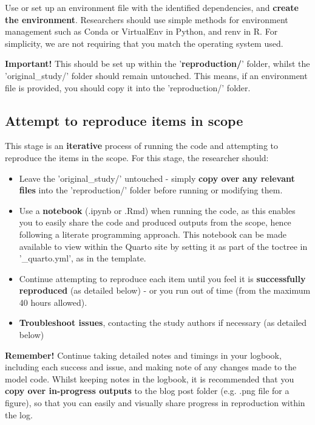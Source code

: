 Use or set up an environment file with the identified dependencies, and \textbf{create the environment}. Researchers should use simple methods for environment management such as Conda or VirtualEnv in Python, and renv in R. For simplicity, we are not requiring that you match the operating system used.

\textbf{Important!} This should be set up within the '\textbf{reproduction/}' folder, whilst the 'original\_study/' folder should remain untouched. This means, if an environment file is provided, you should copy it into the 'reproduction/' folder.

\vspace{0.5cm}
\subsection{Attempt to reproduce items in scope}

This stage is an \textbf{iterative} process of running the code and attempting to reproduce the items in the scope. For this stage, the researcher should:
\begin{itemize}
    \item Leave the 'original\_study/' untouched - simply \textbf{copy over any relevant files} into the 'reproduction/' folder before running or modifying them.
    \item Use a \textbf{notebook} (.ipynb or .Rmd) when running the code, as this enables you to easily share the code and produced outputs from the scope, hence following a literate programming approach. This notebook can be made available to view within the Quarto site by setting it as part of the toctree in '\_quarto.yml', as in the template.
    \item Continue attempting to reproduce each item until you feel it is \textbf{successfully reproduced} (as detailed below) - or you run out of time (from the maximum 40 hours allowed).
    \item \textbf{Troubleshoot issues}, contacting the study authors if necessary (as detailed below)
\end{itemize}

\textbf{Remember!} Continue taking detailed notes and timings in your logbook, including each success and issue, and making note of any changes made to the model code. Whilst keeping notes in the logbook, it is recommended that you \textbf{copy over in-progress outputs} to the blog post folder (e.g. .png file for a figure), so that you can easily and visually share progress in reproduction within the log.

